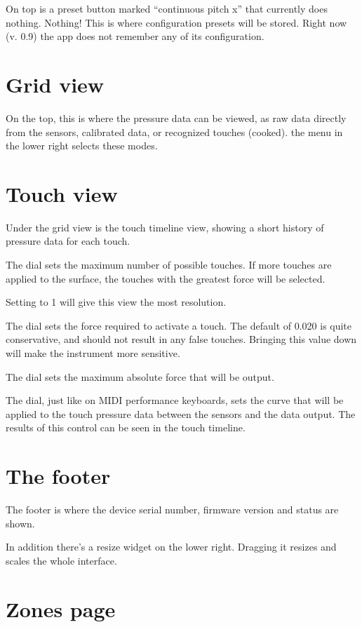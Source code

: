 On top is a preset button marked “continuous pitch x” that currently does nothing.  Nothing!  This is where configuration presets will be stored.  Right now (v. 0.9) the app does not remember any of its configuration.  

\section{Grid view}

On the top, this is where the pressure data can be viewed, as raw data directly from the sensors, calibrated data, or recognized touches (cooked).  the menu in the lower right selects these modes.  

\section{Touch view}

Under the grid view is the touch timeline view, showing a short history of pressure data for each touch.  

The   dial sets the maximum number of possible touches.  If more touches are applied to the surface, the touches with the greatest force will be selected. 

Setting   to 1 will give this view the most resolution.

The  dial sets the force required to activate a touch.  The default of 0.020 is quite conservative, and should not result in any false touches.  Bringing this value down will make the instrument more sensitive.

The  dial sets the maximum absolute force that will be output.  

The  dial, just like on MIDI performance keyboards, sets the curve that will be applied to the touch pressure data between the sensors and the data output.  The results of this control can be seen in the touch timeline. 

\section{The footer}

The footer is where the device serial number, firmware version and status are shown. 

In addition there's a resize widget on the lower right.  Dragging it resizes and scales the whole interface.  

\section{Zones page}

